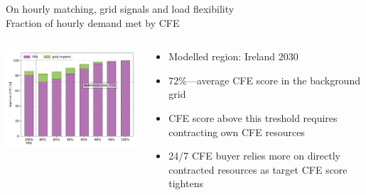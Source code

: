 \begin{frame}{On hourly matching, grid signals and load flexibility \\ Fraction of hourly demand met by CFE}

	\vspace{0.3cm}
	
	\begin{columns}[T]
	\begin{column}{9cm}
	\centering
	
	\includegraphics[width=9.4cm]{images/10-2030-IE-p1-used.pdf}
	\end{column}
	\begin{column}{5cm}
	
		\begin{itemize}
			\item Modelled region: \alert{Ireland 2030} 
			\item \alert{72\%}---average CFE score in the background grid
			\item CFE score above this treshold requires contracting \alert{own CFE resources}
			\item 24/7 CFE buyer \alert{relies more on directly contracted resources as target CFE score tightens}
			\end{itemize}
	\end{column}
	\end{columns}
	
\end{frame}



